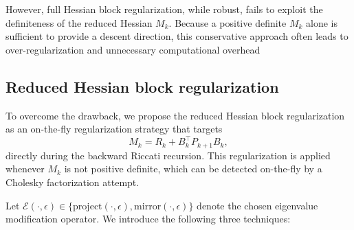 \documentclass[conference]{IEEEtran}
\begin{document}
However, full Hessian block regularization, while robust, fails to exploit the definiteness of the reduced Hessian $M_k$.
Because a positive definite $M_k$ alone is sufficient to provide a descent direction, 
this conservative approach often leads to over-regularization and unnecessary computational overhead

\subsection{Reduced Hessian block regularization}
To overcome the drawback, we propose the reduced Hessian block regularization as an on-the-fly regularization strategy that targets
\begin{equation*}
    M_k = R_k + B_k^\top P_{k+1} B_k,
\end{equation*}
directly during the backward Riccati recursion. 
This regularization is applied whenever $M_k$ is not positive definite, which can be detected on-the-fly by a Cholesky factorization attempt.

Let \(\mathcal{E}(\cdot, \epsilon) \in \{\mathrm{project}(\cdot, \epsilon), \mathrm{mirror}(\cdot, \epsilon)\}\) denote the chosen eigenvalue modification operator. 
We introduce the following three techniques:
\end{document}
